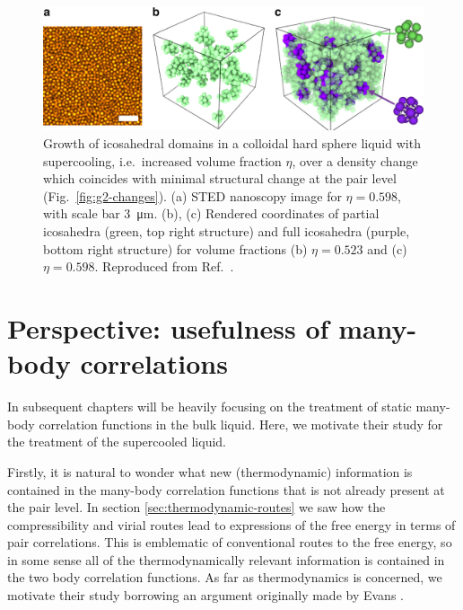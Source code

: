 \documentclass[11pt,twoside]{report}
\begin{document}

\begin{figure}
  \includegraphics[width=\linewidth,outer]{icosahedra-hallett}
  \caption[Growth of icosahedral domains in the supercooled hard sphere liquid]{
    Growth of icosahedral domains in a colloidal hard sphere liquid with supercooling, i.e.\ increased volume fraction $\eta$, over a density change which coincides with minimal structural change at the pair level (Fig.\ \ref{fig:g2-changes}).
    (a) STED nanoscopy image for $\eta = 0.598$, with scale bar \SI{3}{\micro\meter}.
    (b), (c) Rendered coordinates of partial icosahedra (green, top right structure) and full icosahedra (purple, bottom right structure) for volume fractions (b) $\eta = 0.523$ and (c) $\eta = 0.598$.
    Reproduced from Ref.\ \cite{HallettNC2018}.
  }
  \label{fig:icosahedral-domains}
\end{figure}

\section{Perspective: usefulness of many-body correlations}
\label{sec:correlation-perspective}

In subsequent chapters will be heavily focusing on the treatment of static many-body correlation functions in the bulk liquid.
Here, we motivate their study for the treatment of the supercooled liquid.

Firstly, it is natural to wonder what new (thermodynamic) information is contained in the many-body correlation functions that is not already present at the pair level.
In section \ref{sec:thermodynamic-routes} we saw how the compressibility and virial routes lead to expressions of the free energy in terms of pair correlations.
This is emblematic of conventional routes to the free energy, so in some sense all of the thermodynamically relevant information is contained in the two body correlation functions.
As far as thermodynamics is concerned, we motivate their study borrowing an argument originally made by Evans \cite{EvansPrivate2019}.
\end{document}
